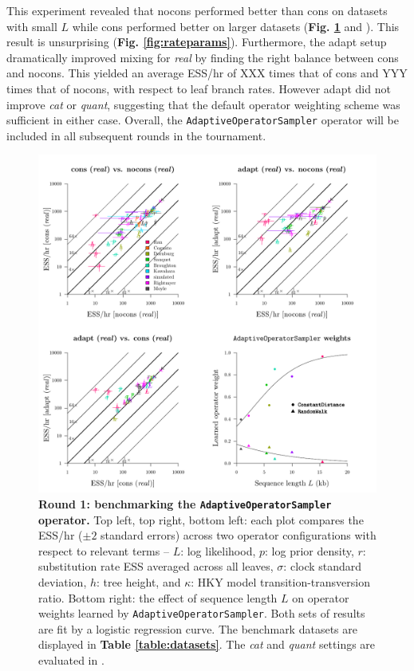 \documentclass[10pt,letterpaper]{article}
\begin{document}
This experiment revealed that nocons performed better than cons on datasets with small $L$ while cons performed better on larger datasets (\textbf{Fig. \ref{fig:round1Results}} and \textbf{}). 
This result is unsurprising (\textbf{Fig. \ref{fig:rateparams}}).
Furthermore, the adapt setup dramatically improved mixing for \textit{real} by finding the right balance between cons and nocons.
This yielded an average ESS/hr of XXX times that of cons and YYY times that of nocons, with respect to leaf branch rates.   
However adapt did not improve \textit{cat} or \textit{quant}, suggesting that the default operator weighting scheme was sufficient in either case.
Overall, the \texttt{AdaptiveOperatorSampler} operator will be included in all subsequent rounds in the tournament. 



\begin{figure}[!h]
\includegraphics[width=\textwidth]{benchmarking/benchmarkingVM/ESS_round1_real.pdf}
\caption{\textbf{Round 1: benchmarking the \texttt{AdaptiveOperatorSampler} operator.} Top left, top right, bottom left: each plot compares the ESS/hr ($\pm 2$ standard errors) across two operator configurations with respect to relevant terms -- $L$: log likelihood, $p$: log prior density, $r$: substitution rate ESS averaged across all leaves, $\sigma$: clock standard deviation, $h$: tree height, and $\kappa$: HKY model transition-transversion ratio.
Bottom right: the effect of sequence length $L$ on operator weights learned by \texttt{AdaptiveOperatorSampler}. Both sets of results are fit by a logistic regression curve.
 The benchmark datasets are displayed in \textbf{Table \ref{table:datasets}}. The \emph{cat} and \emph{quant} settings are evaluated in \textbf{}.  }
\label{fig:round1Results}
\end{figure}
\end{document}
